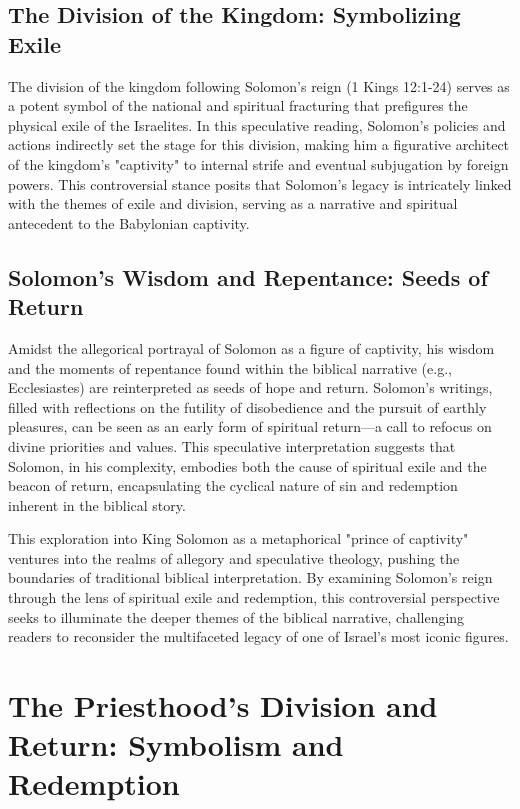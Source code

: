 \section{The Division of the Kingdom: Symbolizing Exile}

The division of the kingdom following Solomon's reign (1 Kings 12:1-24) serves as a potent symbol of the national and spiritual fracturing that prefigures the physical exile of the Israelites. In this speculative reading, Solomon's policies and actions indirectly set the stage for this division, making him a figurative architect of the kingdom's "captivity" to internal strife and eventual subjugation by foreign powers. This controversial stance posits that Solomon's legacy is intricately linked with the themes of exile and division, serving as a narrative and spiritual antecedent to the Babylonian captivity.

\section{Solomon's Wisdom and Repentance: Seeds of Return}

Amidst the allegorical portrayal of Solomon as a figure of captivity, his wisdom and the moments of repentance found within the biblical narrative (e.g., Ecclesiastes) are reinterpreted as seeds of hope and return. Solomon's writings, filled with reflections on the futility of disobedience and the pursuit of earthly pleasures, can be seen as an early form of spiritual return—a call to refocus on divine priorities and values. This speculative interpretation suggests that Solomon, in his complexity, embodies both the cause of spiritual exile and the beacon of return, encapsulating the cyclical nature of sin and redemption inherent in the biblical story.


This exploration into King Solomon as a metaphorical "prince of captivity" ventures into the realms of allegory and speculative theology, pushing the boundaries of traditional biblical interpretation. By examining Solomon's reign through the lens of spiritual exile and redemption, this controversial perspective seeks to illuminate the deeper themes of the biblical narrative, challenging readers to reconsider the multifaceted legacy of one of Israel's most iconic figures.

\chapter{The Priesthood's Division and Return: Symbolism and Redemption}

